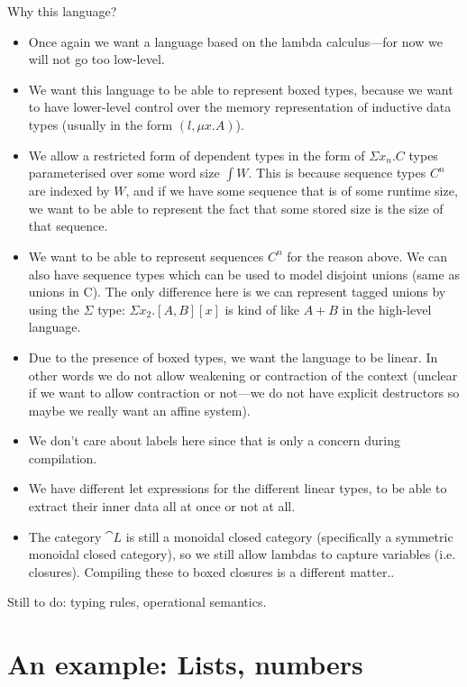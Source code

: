 Why this language?

\begin{itemize}
  \item Once again we want a language based on the lambda calculus---for now we will
        not go too low-level.
  \item We want this language to be able to represent boxed types, because we want to
        have lower-level control over the memory representation of inductive data types
        (usually in the form $(l, \mu x . A)$).
  \item We allow a restricted form of dependent types in the form of $\Sigma x_n . C$
        types parameterised over some word size $\int W$. This is because sequence
        types $C^n$ are indexed by $W$, and if we have some sequence that is of some
        runtime size, we want to be able to represent the fact that some stored size is
        the size of that sequence.
  \item We want to be able to represent sequences $C^n$ for the reason above. We can
        also have sequence types which can be used to model disjoint unions (same as
        unions in C). The only difference here is we can represent tagged unions by
        using the $\Sigma$ type: $\Sigma x_2 . [A, B][x]$ is kind of like $A + B$ in
        the high-level language.
  \item Due to the presence of boxed types, we want the language to be linear. In other
        words we do not allow weakening or contraction of the context (unclear if we
        want to allow contraction or not---we do not have explicit destructors so maybe
        we really want an affine system).
  \item We don't care about labels here since that is only a concern during
        compilation.
  \item We have different let expressions for the different linear types, to be able to
        extract their inner data all at once or not at all.
  \item The category $\cat L$ is still a monoidal closed category (specifically a
        symmetric monoidal closed category), so we still allow lambdas to capture
        variables (i.e. closures). Compiling these to boxed closures is a different
        matter..
\end{itemize}

Still to do: typing rules, operational semantics.

\section{An example: Lists, numbers}

